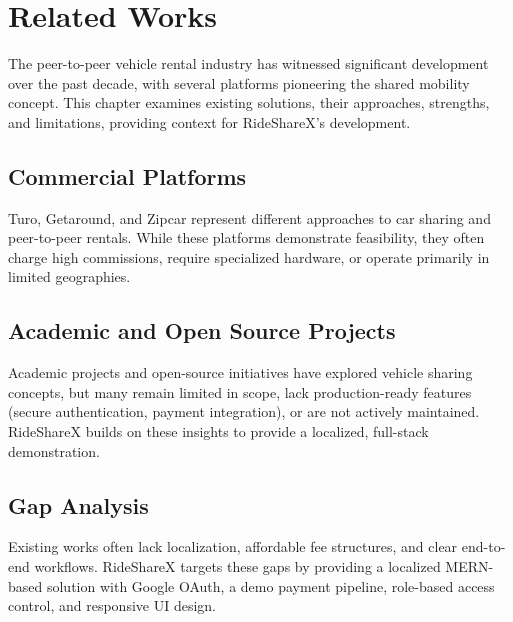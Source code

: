 \chapter{Related Works}

The peer-to-peer vehicle rental industry has witnessed significant development over the past decade, with several platforms pioneering the shared mobility concept. This chapter examines existing solutions, their approaches, strengths, and limitations, providing context for RideShareX's development.

\section{Commercial Platforms}
Turo, Getaround, and Zipcar represent different approaches to car sharing and peer-to-peer rentals. While these platforms demonstrate feasibility, they often charge high commissions, require specialized hardware, or operate primarily in limited geographies.

\section{Academic and Open Source Projects}
Academic projects and open-source initiatives have explored vehicle sharing concepts, but many remain limited in scope, lack production-ready features (secure authentication, payment integration), or are not actively maintained. RideShareX builds on these insights to provide a localized, full-stack demonstration.

\section{Gap Analysis}
Existing works often lack localization, affordable fee structures, and clear end-to-end workflows. RideShareX targets these gaps by providing a localized MERN-based solution with Google OAuth, a demo payment pipeline, role-based access control, and responsive UI design.
